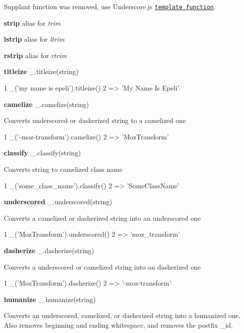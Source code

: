 Supplant function was removed, use Underscore.\+js \href{http://documentcloud.github.com/underscore/#template}{\tt template function}.

{\bfseries strip} alias for {\itshape trim}

{\bfseries lstrip} alias for {\itshape ltrim}

{\bfseries rstrip} alias for {\itshape rtrim}

{\bfseries titleize} \+\_\+.\+titleize(string)


\begin{DoxyCode}
1 \_('my name is epeli').titleize()
2 => 'My Name Is Epeli'
\end{DoxyCode}


{\bfseries camelize} \+\_\+.\+camelize(string)

Converts underscored or dasherized string to a camelized one


\begin{DoxyCode}
1 \_('-moz-transform').camelize()
2 => 'MozTransform'
\end{DoxyCode}


{\bfseries classify} \+\_\+.\+classify(string)

Converts string to camelized class name


\begin{DoxyCode}
1 \_('some\_class\_name').classify()
2 => 'SomeClassName'
\end{DoxyCode}


{\bfseries underscored} \+\_\+.\+underscored(string)

Converts a camelized or dasherized string into an underscored one


\begin{DoxyCode}
1 \_('MozTransform').underscored()
2 => 'moz\_transform'
\end{DoxyCode}


{\bfseries dasherize} \+\_\+.\+dasherize(string)

Converts a underscored or camelized string into an dasherized one


\begin{DoxyCode}
1 \_('MozTransform').dasherize()
2 => '-moz-transform'
\end{DoxyCode}


{\bfseries humanize} \+\_\+.\+humanize(string)

Converts an underscored, camelized, or dasherized string into a humanized one. Also removes beginning and ending whitespace, and removes the postfix \textquotesingle{}\+\_\+id\textquotesingle{}.


